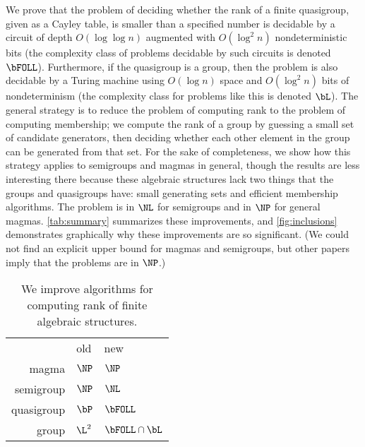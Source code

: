 \documentclass{article}
\begin{document}
%
We prove that the problem of deciding whether the rank of a finite quasigroup, given as a Cayley table, is smaller than a specified number is decidable by a circuit of depth $O(\log \log n)$ augmented with $O(\log^2 n)$ nondeterministic bits (the complexity class of problems decidable by such circuits is denoted $\bFOLL$).
Furthermore, if the quasigroup is a group, then the problem is also decidable by a Turing machine using $O(\log n)$ space and $O(\log^2 n)$ bits of nondeterminism (the complexity class for problems like this is denoted $\bL$).
The general strategy is to reduce the problem of computing rank to the problem of computing membership; we compute the rank of a group by guessing a small set of candidate generators, then deciding whether each other element in the group can be generated from that set.
For the sake of completeness, we show how this strategy applies to semigroups and magmas in general, though the results are less interesting there because these algebraic structures lack two things that the groups and quasigroups have: small generating sets and efficient membership algorithms.
The problem is in $\NL$ for semigroups and in $\NP$ for general magmas.
\autoref{tab:summary} summarizes these improvements, and \autoref{fig:inclusions} demonstrates graphically why these improvements are so significant.
(We could not find an explicit upper bound for magmas and semigroups, but other papers imply that the problems are in $\NP$.)
\begin{table}
  \caption{\label{tab:summary}We improve algorithms for computing rank of finite algebraic structures.}
  \begin{center}
    \begin{tabular}{r l l}
      & old & new \\[5pt]
      magma & $\NP$ & $\NP$ \\
      semigroup & $\NP$ & $\NL$ \\
      quasigroup & $\bP$ \autocite{py96} & $\bFOLL$ \\
      group & $\L^2$ \autocite{lsz77} & $\bFOLL \cap \bL$
    \end{tabular}
  \end{center}
\end{table}
\end{document}
